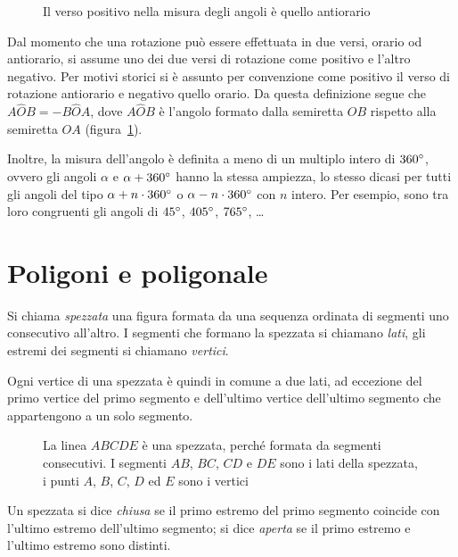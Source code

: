 \begin{figure}[htb]
\centering
\caption{Il verso positivo nella misura degli angoli è quello antiorario}\label{fig:1.43}
\end{figure}

Dal momento che una rotazione può essere effettuata in due versi, orario od antiorario, si assume uno dei due versi di rotazione come positivo e l'altro negativo. Per motivi storici si è assunto per convenzione come positivo il verso di rotazione antiorario e negativo quello orario.
Da questa definizione segue che $A\widehat{O}B = -B\widehat{O}A$, dove $A\widehat{O}B$ è l'angolo formato dalla semiretta $OB$ rispetto alla semiretta $OA$ (figura~\ref{fig:1.43}).

Inoltre, la misura dell'angolo è definita a meno di un multiplo intero di $360{}^{\circ}$, ovvero gli angoli $\alpha$ e $\alpha+360{}^{\circ}$ hanno la stessa ampiezza, lo stesso dicasi per tutti gli angoli del tipo $\alpha+n\cdot 360{}^{\circ}$ o $\alpha - n\cdot 360{}^{\circ}$ con $n$ intero. Per esempio, sono tra loro congruenti gli angoli di $45{}^{\circ}$, $405{}^{\circ}$, $765{}^{\circ}$, \ldots{}


\section{Poligoni e poligonale}

\begin{definizione}
Si chiama \emph{spezzata} una figura formata da una sequenza ordinata di segmenti uno consecutivo all'altro. I segmenti che formano la spezzata si chiamano \emph{lati}, gli estremi dei segmenti si chiamano \emph{vertici}.
\end{definizione}

Ogni vertice di una spezzata è quindi in comune a due lati, ad eccezione del primo vertice del primo segmento e dell'ultimo vertice dell'ultimo segmento che appartengono a un solo segmento.

\begin{figure}[htb]
\centering
\caption{La linea $ABCDE$ è una spezzata, perché formata da segmenti consecutivi. I segmenti $AB$, $BC$, $CD$ e $DE$ sono i lati della spezzata, i punti $A$, $B$, $C$, $D$ ed $E$ sono i vertici}
\end{figure}

\begin{definizione}
Un spezzata si dice \emph{chiusa} se il primo estremo del primo segmento coincide con l'ultimo estremo dell'ultimo segmento; si dice \emph{aperta} se il primo estremo e l'ultimo estremo sono distinti.
\end{definizione}

